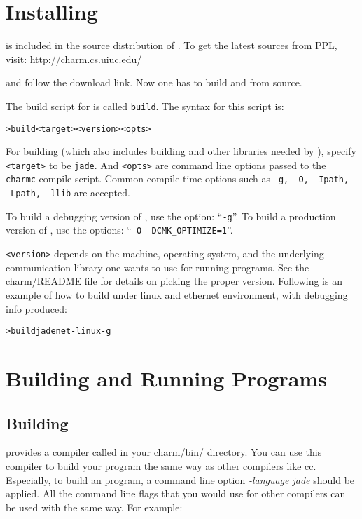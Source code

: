 \documentclass[10pt]{article}
\begin{document}
\section{Installing \jade}

\jade is included in the source distribution of \charmpp{}. 
To get the latest sources from PPL, visit:
	http://charm.cs.uiuc.edu/

and follow the download link.
Now one has to build \charmpp{} and \jade from source.

The build script for \charmpp{} is called \texttt{build}. The syntax for this
script is:

\begin{alltt}
> build <target> <version> <opts>
\end{alltt}

For building \jade (which also includes building \charmpp{} and other
libraries needed by \jade), specify \verb+<target>+ to be \verb+jade+. And
\verb+<opts>+ are command line options passed to the \verb+charmc+ compile
script.  Common compile time options such as \texttt{-g, -O, -Ipath, -Lpath,
-llib} are accepted. 

To build a debugging version of \jade, use the option: ``\texttt{-g}''. 
To build a production version of \jade, use the options: ``\texttt{-O 
-DCMK\_OPTIMIZE=1}''.

\verb+<version>+ depends on the machine, operating system, and the underlying
communication library one wants to use for running \jade programs.
See the charm/README file for details on picking the proper version.
Following is an example of how to build \jade under linux and ethernet
environment, with debugging info produced:

\begin{alltt}
> build jade net-linux -g
\end{alltt}

\section{Building and Running \jade Programs}
\subsection{Building}
\charmpp{} provides a compiler called \charmc in your charm/bin/ directory. 
You can use this compiler to build your \jade program the same way as other
compilers like cc. Especially, to build an \jade program, a command line 
option \emph{-language jade} should be applied. All the command line 
flags that you would use for other compilers can be used with \charmc the 
same way. For example:
\end{document}
